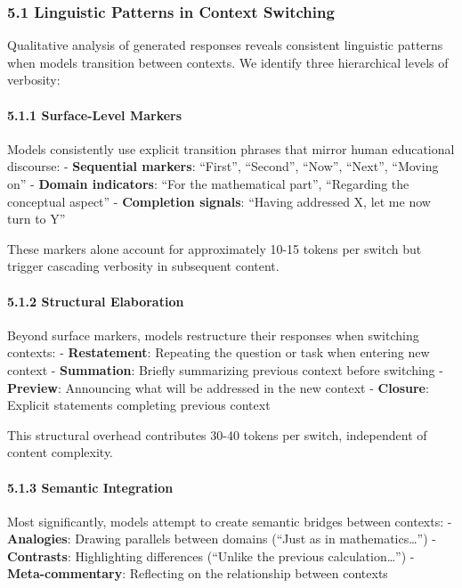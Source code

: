 \documentclass[
  11pt]{article}
\begin{document}
\subsubsection{5.1 Linguistic Patterns in Context
Switching}\label{linguistic-patterns-in-context-switching}

Qualitative analysis of generated responses reveals consistent
linguistic patterns when models transition between contexts. We identify
three hierarchical levels of verbosity:

\paragraph{5.1.1 Surface-Level Markers}\label{surface-level-markers}

Models consistently use explicit transition phrases that mirror human
educational discourse: - \textbf{Sequential markers}: ``First'',
``Second'', ``Now'', ``Next'', ``Moving on'' - \textbf{Domain
indicators}: ``For the mathematical part'', ``Regarding the conceptual
aspect'' - \textbf{Completion signals}: ``Having addressed X, let me now
turn to Y''

These markers alone account for approximately 10-15 tokens per switch
but trigger cascading verbosity in subsequent content.

\paragraph{5.1.2 Structural Elaboration}\label{structural-elaboration}

Beyond surface markers, models restructure their responses when
switching contexts: - \textbf{Restatement}: Repeating the question or
task when entering new context - \textbf{Summation}: Briefly summarizing
previous context before switching - \textbf{Preview}: Announcing what
will be addressed in the new context - \textbf{Closure}: Explicit
statements completing previous context

This structural overhead contributes 30-40 tokens per switch,
independent of content complexity.

\paragraph{5.1.3 Semantic Integration}\label{semantic-integration}

Most significantly, models attempt to create semantic bridges between
contexts: - \textbf{Analogies}: Drawing parallels between domains
(``Just as in mathematics\ldots{}'') - \textbf{Contrasts}: Highlighting
differences (``Unlike the previous calculation\ldots{}'') -
\textbf{Meta-commentary}: Reflecting on the relationship between
contexts
\end{document}

